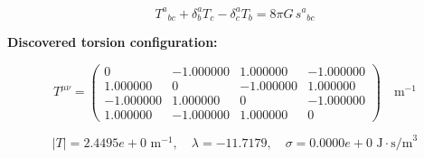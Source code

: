 
\begin{equation}
  T^a{}_{bc} + \delta^a_b T_c - \delta^a_c T_b = 8\pi G \, s^a{}_{bc}
\end{equation}

\textbf{Discovered torsion configuration:}

\begin{equation}
  T^{\mu\nu} = \begin{pmatrix}
    0 & -1.000000 & 1.000000 & -1.000000 \\
    1.000000 & 0 & -1.000000 & 1.000000 \\
    -1.000000 & 1.000000 & 0 & -1.000000 \\
    1.000000 & -1.000000 & 1.000000 & 0
  \end{pmatrix} \quad \text{m}^{-1}
\end{equation}

\begin{equation}
  |T| = 2.4495e+0 \text{ m}^{-1}, \quad
  \lambda = -11.7179, \quad
  \sigma = 0.0000e+0 \text{ J}\cdot\text{s/m}^3
\end{equation}